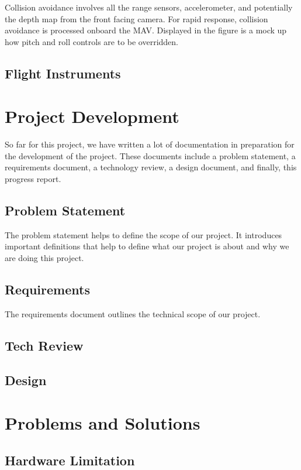 \documentclass[onecolumn, oneside, letterpaper, draftclsnofoot, 10pt, compsoc]{IEEEtran}
\begin{document}
Collision avoidance involves all the range sensors, accelerometer, and potentially the depth map from the front facing camera. For rapid response, collision avoidance is processed onboard the MAV. Displayed in the figure is a mock up how pitch and roll controls are to be overridden.

\subsection{Flight Instruments}

\section{Project Development}
So far for this project, we have written a lot of documentation in preparation for the development of the project. These documents include a problem statement, a requirements document, a technology review, a design document, and finally, this progress report.
\subsection{Problem Statement}
The problem statement helps to define the scope of our project. It introduces important definitions that help to define what our project is about and why we are doing this project.
\subsection{Requirements}
The requirements document outlines the technical scope of our project.
\subsection{Tech Review}
\subsection{Design}



\section{Problems and Solutions}
\subsection{Hardware Limitation}
\end{document}
